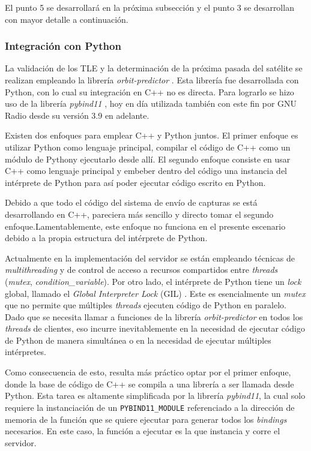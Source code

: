 \documentclass[../../main.tex]{subfiles}
\begin{document}
El punto 5 se desarrollará en la próxima subsección y el punto 3 se desarrollan con mayor detalle a continuación.

\subsubsection{Integración con Python}
La validación de los TLE y la determinación de la próxima pasada del satélite se realizan empleando la librería \textit{orbit-predictor} \cite{orbit-predictor}. Esta librería fue desarrollada con Python, con lo cual su integración en C++ no es directa. Para lograrlo se hizo uso de la librería \textit{pybind11} \cite{pybind11}, hoy en día utilizada también con este fin por GNU Radio desde su versión 3.9 en adelante. 

Existen dos enfoques para emplear C++ y Python juntos. El primer enfoque es utilizar Python como lenguaje principal, compilar el código de C++ como un módulo de Pythony ejecutarlo desde allí. El segundo enfoque consiste en usar C++ como lenguaje principal y embeber dentro del código una instancia del intérprete de Python para así poder ejecutar código escrito en Python. 

Debido a que todo el código del sistema de envío de capturas se está desarrollando en C++, pareciera más sencillo y directo tomar el segundo enfoque.Lamentablemente, este enfoque no funciona en el presente escenario debido a la propia estructura del intérprete de Python.

Actualmente en la implementación del servidor se están empleando técnicas de \textit{multithreading} y de control de acceso a recursos compartidos entre \textit{threads} (\textit{mutex}, \textit{condition\_variable}). Por otro lado, el intérprete de Python tiene un \textit{lock} global, llamado el \textit{Global Interpreter Lock} (GIL) \cite{GIL}. Este es esencialmente un \textit{mutex} que no permite que múltiples \textit{threads} ejecuten código de Python en paralelo. Dado que se necesita llamar a funciones de la librería \textit{orbit-predictor} en todos los \textit{threads} de clientes, eso incurre inevitablemente en la necesidad de ejecutar código de Python de manera simultánea o en la necesidad de ejecutar múltiples intérpretes.

Como consecuencia de esto, resulta más práctico optar por el primer enfoque, donde la base de código de C++ se compila a una librería a ser llamada desde Python. Esta tarea es altamente simplificada por la librería \textit{pybind11}, la cual solo requiere la instanciación de un \texttt{PYBIND11\_MODULE} referenciado a la dirección de memoria de la función que se quiere ejecutar para generar todos los \textit{bindings} necesarios. En este caso, la función a ejecutar es la que instancia y corre el servidor.
\end{document}
